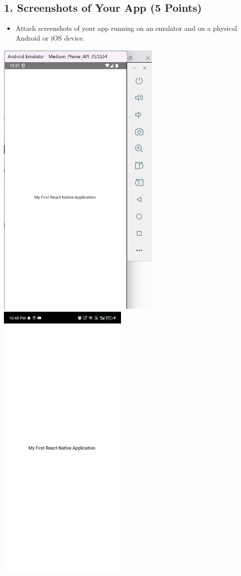\documentclass{article}
\begin{document}
\subsection*{1. Screenshots of Your App (5 Points)}
\begin{itemize}
    \item Attach screenshots of your app running on an emulator and on a physical Android or iOS device.
\end{itemize}
\includegraphics[width=3.14063in,height=5.53233in]{media/image5.png}
\includegraphics[width=2.49141in,height=5.53646in]{media/image6.jpg}
\end{document}
